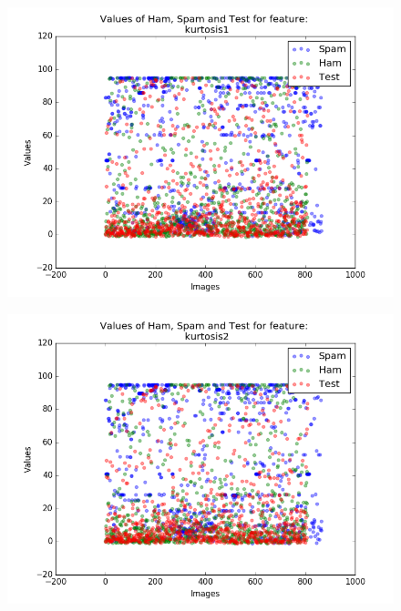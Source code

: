 \begin{figure}[h]
	\centering
	\begin{minipage}{.5\textwidth}
		\centering
		\includegraphics[width=\linewidth]{images/appA/kurtosis1_values_scatter}
		\label{fig:kurtosis1_values_scatter}
	\end{minipage}%
	\begin{minipage}{.5\textwidth}
		\centering
		\includegraphics[width=\linewidth]{images/appA/kurtosis2_values_scatter}
		\label{fig:kurtosis2_values_scatter}
	\end{minipage}
\end{figure}



